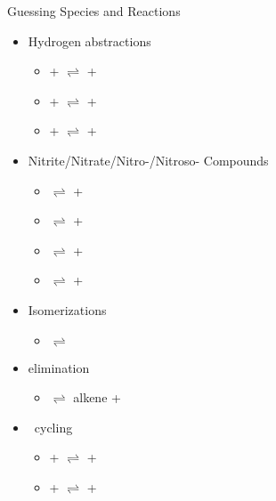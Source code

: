 \begin{frame}{Guessing Species and Reactions}

\vspace{-5mm}

    \begin{multicols}{2}
    \begin{itemize}
        \item Hydrogen abstractions
        \begin{itemize}
            \item {} +  $\rightleftharpoons$  + 
            \item {} +  $\rightleftharpoons$  + 
            \item {} +  $\rightleftharpoons$  + 
        \end{itemize}
        \item Nitrite/Nitrate/Nitro-/Nitroso- Compounds
        \begin{itemize}
            \item {} $\rightleftharpoons$  + 
            \item {} $\rightleftharpoons$  + 
            \item {} $\rightleftharpoons$  + 
            \item {} $\rightleftharpoons$  + 
        \end{itemize}
        \item Isomerizations  
        \begin{itemize}
            \item {} $\rightleftharpoons$ 
        \end{itemize}
        \item {} elimination
        \begin{itemize}
            \item {} $\rightleftharpoons$ alkene + 
        \end{itemize}
        \item \nox\ cycling
        \begin{itemize}
            \item {} +  $\rightleftharpoons$  + 
            \item {} +  $\rightleftharpoons$  + 
        \end{itemize}
    \end{itemize}
    

\end{multicols}
\end{frame}
